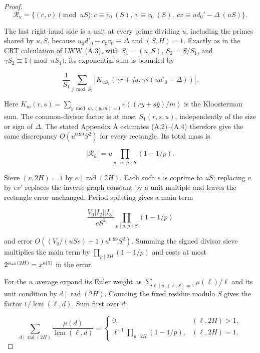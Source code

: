 \documentclass[11pt]{article}
\theoremstyle{definition}
\theoremstyle{remark}
\numberwithin{equation}{section}
\begin{document}
\begin{proof}
\begin{equation}
\mathcal R_u=\{(c,v)\pmod{uS}:c\equiv c_0\ (S),\ v\equiv v_0\ (S),\ cv\equiv ud_0'-\Delta\ (uS)\}.
\end{equation}


The last right-hand side is a unit at every prime dividing $u$, including the primes shared by $u,S$, because $u_0d'_0-c_0v_0\equiv\Delta$ and $(S,H)=1$. Exactly as in the CRT calculation of LWW (A.3), with $S_1=(u,S)$, $S_2=S/S_1$, and $\gamma S_2\equiv1\pmod{uS_1}$, its exponential sum is bounded by


\begin{equation}
\frac1{S_1}\sum_{j\bmod S_1}
 |K_{uS_1}(\gamma r+ju,\gamma s(ud'_0-\Delta))|.
\end{equation}


Here
$K_m(r,s)=\sum_{y\bmod m,(y,m)=1}e((ry+s\bar y)/m)$
is the Kloosterman sum. The common-divisor factor is at most $S_1(r,s,u)$, independently of the size or sign of $\Delta$. The stated Appendix A estimates (A.2)–(A.4) therefore give the same discrepancy $O(u^{0.99}S^2)$ for every rectangle. Its total mass is


\begin{equation}
|\mathcal R_u|=u\prod_{p\mid u,\ p\nmid S}(1-1/p).
\end{equation}


Sieve $(v,2H)=1$ by $e\mid\operatorname{rad}(2H)$. Each such $e$ is coprime to $uS$; replacing $v$ by $ev'$ replaces the inverse-graph constant by a unit multiple and leaves the rectangle error unchanged. Period splitting gives a main term


\begin{equation}
\frac{V_0|I_2||I_3|}{eS^2}\prod_{p\mid u,p\nmid S}(1-1/p)
\end{equation}


and error $O((V_0/(uSe)+1)u^{0.99}S^2)$. Summing the signed divisor sieve multiplies the main term by $\prod_{p\mid2H}(1-1/p)$ and costs at most $2^{\omega_{\rm all}(2H)}=x^{o(1)}$ in the error.

For the $u$ average expand its Euler weight as $\sum_{\ell\mid u,(\ell,S)=1}\mu(\ell)/\ell$ and its unit condition by $d\mid\operatorname{rad}(2H)$. Counting the fixed residue modulo $S$ gives the factor $1/\operatorname{lcm}(\ell,d)$. Sum first over $d$:


\begin{equation}\label{v2:4-2}
\sum_{d\mid\operatorname{rad}(2H)}\frac{\mu(d)}{\operatorname{lcm}(\ell,d)}
=\begin{cases}0,&(\ell,2H)>1,\\
\ell^{-1}\prod_{p\mid2H}(1-1/p),&(\ell,2H)=1.
\end{cases}
\end{equation}



\end{proof}
\end{document}
